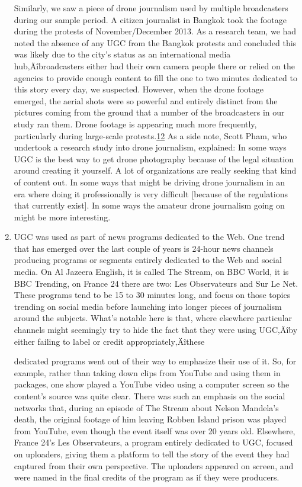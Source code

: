\documentclass[symmetric, notoc, nobib]{towcenter-book}
\begin{document}
\begin{enumerate}
Similarly, we saw a piece of drone journalism used by multiple broadcasters
during our sample period. A citizen journalist in Bangkok took the
footage during the protests of November/December 2013. As a research
team, we had noted the absence of any UGC from the Bangkok protests and
concluded this was likely due to the city's status as an international media
hub‚Äîbroadcasters either had their own camera people there or relied on
the agencies to provide enough content to fill the one to two minutes dedicated
to this story every day, we suspected. However, when the drone footage
emerged, the aerial shots were so powerful and entirely distinct from
the pictures coming from the ground that a number of the broadcasters
in our study ran them. Drone footage is appearing much more frequently,
particularly during large-scale protests.{\href{#endnotes}{12}} As a side note, Scott Pham, who
undertook a research study into drone journalism, explained:
In some ways UGC is the best way to get drone photography because
of the legal situation around creating it yourself. A lot of organizations
are really seeking that kind of content out. In some ways that
might be driving drone journalism in an era where doing it professionally
is very difficult [because of the regulations that currently
exist]. In some ways the amateur drone journalism going on might
be more interesting.
\item UGC was used as part of news programs dedicated to the Web.
One trend that has emerged over the last couple of years is 24-hour news
channels producing programs or segments entirely dedicated to the Web
and social media. On Al Jazeera English, it is called The Stream, on BBC
World, it is BBC Trending, on France 24 there are two: Les Observateurs and
Sur Le Net. These programs tend to be 15 to 30 minutes long, and focus on
those topics trending on social media before launching into longer pieces
of journalism around the subjects. What's notable here is that, where elsewhere
particular channels might seemingly try to hide the fact that they
were using UGC‚Äîby either failing to label or credit appropriately‚Äîthese

dedicated programs went out of their way to emphasize their use of it. So,
for example, rather than taking down clips from YouTube and using them in
packages, one show played a YouTube video using a computer screen so the
content's source was quite clear. There was such an emphasis on the social
networks that, during an episode of The Stream about Nelson Mandela's
death, the original footage of him leaving Robben Island prison was played
from YouTube, even though the event itself was over 20 years old.
Elsewhere, France 24's Les Observateurs, a program entirely dedicated to
UGC, focused on uploaders, giving them a platform to tell the story of
the event they had captured from their own perspective. The uploaders
appeared on screen, and were named in the final credits of the program as
if they were producers.
\end{enumerate}
\end{document}
